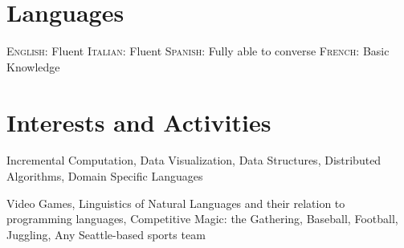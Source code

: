 \documentclass[letterpaper,10pt]{article} %
\begin{document}

\section{Languages}

\textsc{English:} Fluent \hfill \textsc{Italian:} Fluent \hfill 
\textsc{Spanish:} Fully able to converse \hfill \textsc{French:} Basic Knowledge




\section{Interests and Activities}

Incremental Computation, Data Visualization, Data Structures, Distributed Algorithms, Domain Specific Languages

Video Games, Linguistics of Natural Languages and their relation to programming languages, Competitive Magic: the Gathering, 
Baseball, Football, Juggling, Any Seattle-based sports team

\end{document}
